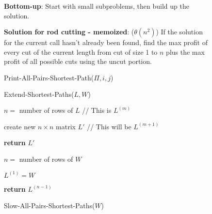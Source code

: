 \documentclass[7pt]{article}
\begin{document}
\begin{figure*}[ttt!] %
  \begin{minipage}[t]{.25\linewidth}
    \vspace{0pt}
    
    {\bf Bottom-up}: Start with small subproblems, then build up the
    solution.
    
    {\bf Solution for rod cutting - memoized}: ($\theta(n^2)$) If the solution for the
    current call hasn't already been found, find the max profit of every
    cut of the current length from cut of size 1 to $n$ plus the max
    profit of all possible cuts using the uncut portion.   
    
    \begin{algorithm}[H]
      \caption{Print-All-Pairs-Shortest-Path($\Pi,i,j$)}
    \end{algorithm}
    
    \begin{algorithm}[H]
    \caption{Extend-Shortest-Paths($L,W$)}
      $n=$ number of rows of $L$  \hspace*{0.25in} // This is $L^{(m)}$ 

      create new $n \times n$ matrix $L'$ \hspace*{0.125in} // This will be
$L^{(m+1)}$ 

      {\bf return} $L'$ 
    \end{algorithm}

    \begin{algorithm}[H]
    \caption{Slow-All-Pairs-Shortest-Paths($W$)}
      $n=$ number of rows of $W$ 

      $L^{(1)}=W$ 

      {\bf return} $L^{(n-1)}$ 
    \end{algorithm}

  \end{minipage}
  \begin{minipage}[t]{.25\linewidth}
    \vspace{0pt}


\end{minipage}
\end{figure*}
\end{document}
